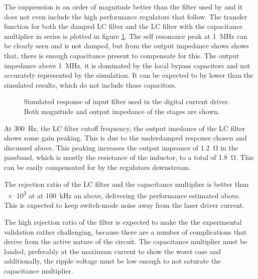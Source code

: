 The suppression is an order of magnitude better than the filter used by \citeauthor{libbrecht_hall} and it does not even include the high performance regulators that follow. The transfer function for both the damped LC filter and the LC filter with the capacitance multiplier in series is plotted in figure \ref{fig:laser_driver_input_filter}. The self resonance peak at \qty{1}{\MHz} can be clearly seen and is not damped, but from the output impedance shows shows that, there is enough capacitance present to compensate for this. The output impedance above \qty{1}{\MHz}, it is dominated by the local bypass capacitors and not accurately represented by the simulation. It can be expected to by lower than the simulated results, which do not include those capacitors.
\begin{figure}[ht]
    \centering
    
    \caption{Simulated response of input filter used in the digital current driver. Both magnitude and output impedance of the stages are shown.}
    \label{fig:laser_driver_input_filter}
\end{figure}

At \qty{300}{\Hz}, the LC filter cutoff frequency, the output imedance of the LC filter shows some gain peaking. This is due to the underdamped response chosen and discussed above. This peaking increases the output impeance of \qty{1.2}{\ohm} in the passband, which is mostly the resistance of the inductor, to a total of \qty{1.8}{\ohm}. This can be easily compensated for by the regulators downstream.

The rejection ratio of the LC filter and the capacitance multiplier is better than \num{e3} at at \qty{100}{\kHz} an above, delivering the performance estimated above. This is expected to keep switch-mode noise away from the laser driver current.

The high rejection ratio of the filter is expected to make the the experimental validation rather challenging, because there are a number of complications that derive from the active nature of the circuit. The capacitance multiplier must be loaded, preferably at the maximum current to show the worst case and additionally, the ripple voltage must be low enough to not saturate the capacitance multiplier.

